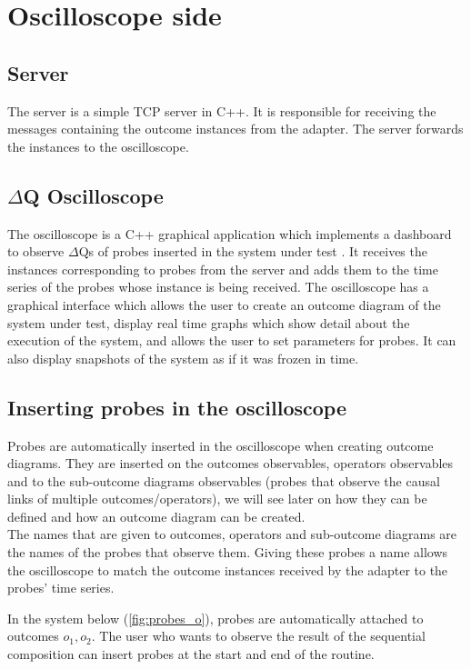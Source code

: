 \section{Oscilloscope side}
    \subsection{Server} The server is a simple TCP server in C++. It is responsible for receiving the messages containing the outcome instances from the adapter. The server forwards the instances to the oscilloscope.
    
    \subsection{$\Delta$Q Oscilloscope} The oscilloscope is a C++ graphical application which implements a dashboard to observe $\Delta$Qs of probes inserted in the system under test \cite{osc-g}. It receives the instances corresponding to probes from the server and adds them to the time series of the probes whose instance is being received. 
    The oscilloscope has a graphical interface which allows the user to create an outcome diagram of the system under test, display real time graphs which show detail about the execution of the system, and allows the user to set parameters for probes. It can also display snapshots of the system as if it was frozen in time.

    \subsection{Inserting probes in the oscilloscope}
        Probes are automatically inserted in the oscilloscope when creating outcome diagrams. They are inserted on the outcomes observables, operators observables and to the sub-outcome diagrams observables (probes that observe the causal links of multiple outcomes/operators), we will see later on how they can be defined and how an outcome diagram can be created. \\
    The names that are given to outcomes, operators and sub-outcome diagrams are the names of the probes that observe them. Giving these probes a name allows the oscilloscope to match the outcome instances received by the adapter to the probes' time series.

        In the system below (\cref{fig:probes_o}), probes are automatically attached to outcomes $o_1, o_2$. The user who wants to observe the result of the sequential composition can insert probes at the start and end of the routine. 
    

